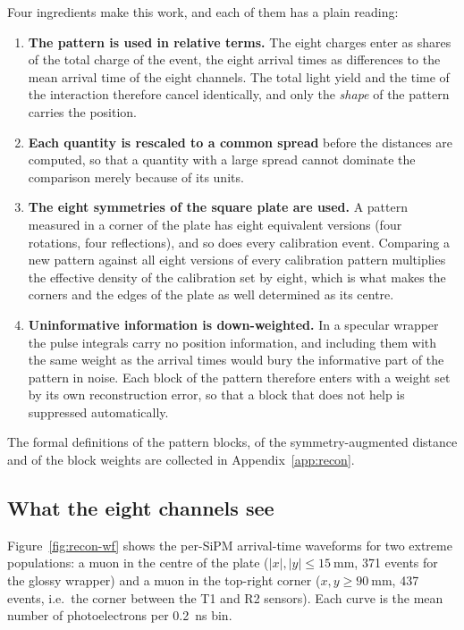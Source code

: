 \documentclass[11pt,a4paper]{article}
\begin{document}
Four ingredients make this work, and each of them has a plain reading:
\begin{enumerate}
  \item \textbf{The pattern is used in relative terms.}  The eight charges
        enter as shares of the total charge of the event, the eight arrival
        times as differences to the mean arrival time of the eight channels.
        The total light yield and the time of the interaction therefore cancel
        identically, and only the \emph{shape} of the pattern carries the
        position.
  \item \textbf{Each quantity is rescaled to a common spread} before the
        distances are computed, so that a quantity with a large spread cannot
        dominate the comparison merely because of its units.
  \item \textbf{The eight symmetries of the square plate are used.}  A pattern
        measured in a corner of the plate has eight equivalent versions (four
        rotations, four reflections), and so does every calibration event.
        Comparing a new pattern against all eight versions of every
        calibration pattern multiplies the effective density of the
        calibration set by eight, which is what makes the corners and the
        edges of the plate as well determined as its centre.
  \item \textbf{Uninformative information is down-weighted.}  In a specular
        wrapper the pulse integrals carry no position information, and
        including them with the same weight as the arrival times would bury
        the informative part of the pattern in noise.  Each block of the
        pattern therefore enters with a weight set by its own reconstruction
        error, so that a block that does not help is suppressed automatically.
\end{enumerate}
The formal definitions of the pattern blocks, of the symmetry-augmented
distance and of the block weights are collected in Appendix~\ref{app:recon}.

\subsection{What the eight channels see}
\label{sec:recon-pattern}

Figure~\ref{fig:recon-wf} shows the per-SiPM arrival-time waveforms for two
extreme populations: a muon in the centre of the plate ($|x|,|y|\leq
\SI{15}{\milli\meter}$, \num{371} events for the glossy wrapper) and a muon in
the top-right corner ($x,y\geq\SI{90}{\milli\meter}$, \num{437} events, i.e.\
the corner between the T1 and R2 sensors).  Each curve is the mean number of
photoelectrons per \SI{0.2}{\nano\second} bin.
\end{document}
